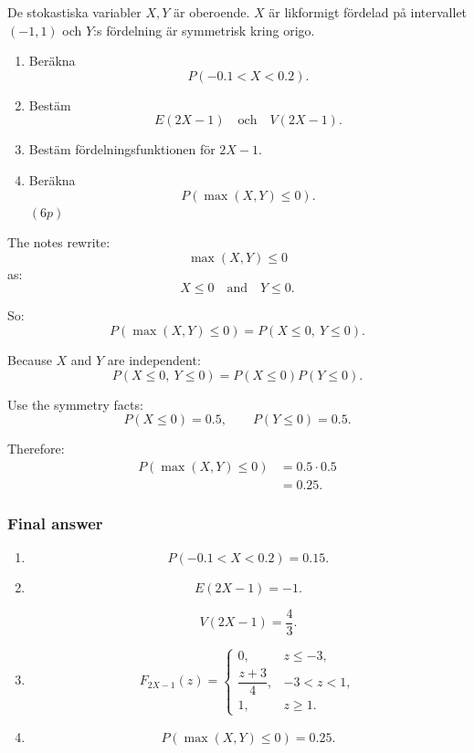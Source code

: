 \documentclass[10pt]{article}
\begin{document}
De stokastiska variabler \(X,Y\) är oberoende.
\(X\) är likformigt fördelad på intervallet
\((-1,1)\) och \(Y\):s fördelning är symmetrisk
kring origo.

\begin{enumerate}[label=\alph*)]
\item Beräkna
\[
P(-0.1<X<0.2).
\]

\item Bestäm
\[
E(2X-1)
\quad\text{och}\quad
V(2X-1).
\]

\item Bestäm fördelningsfunktionen för \(2X-1\).

\item Beräkna
\[
P(\max(X,Y)\le 0).
\]
\((6p)\)
\end{enumerate}

The notes rewrite:
\[
\max(X,Y)\le 0
\]
as:
\[
X\le 0
\quad\text{and}\quad
Y\le 0.
\]

So:
\[
P(\max(X,Y)\le 0)
=
P(X\le 0,\ Y\le 0).
\]

Because \(X\) and \(Y\) are independent:
\[
P(X\le 0,\ Y\le 0)
=
P(X\le 0)P(Y\le 0).
\]

Use the symmetry facts:
\[
P(X\le 0)=0.5,
\qquad
P(Y\le 0)=0.5.
\]

Therefore:
\begin{align*}
P(\max(X,Y)\le 0)
&=
0.5\cdot 0.5
\\[2mm]
&=
0.25.
\end{align*}

\subsubsection*{Final answer}

\begin{enumerate}[label=\alph*)]
\item
\[
P(-0.1<X<0.2)=0.15.
\]

\item
\[
E(2X-1)=-1.
\]

\[
V(2X-1)=\frac43.
\]

\item
\[
F_{2X-1}(z)=
\begin{cases}
0,
& z\le -3,\\
\dfrac{z+3}{4},
& -3<z<1,\\
1,
& z\ge 1.
\end{cases}
\]

\item
\[
P(\max(X,Y)\le 0)=0.25.
\]
\end{enumerate}
\end{document}
